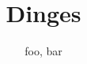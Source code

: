 \documentclass[]{report}
\title{Dinges}
\author{foo, bar}
\begin{document}
\maketitle

\begin{abstract}
\end{abstract}
\end{document}
